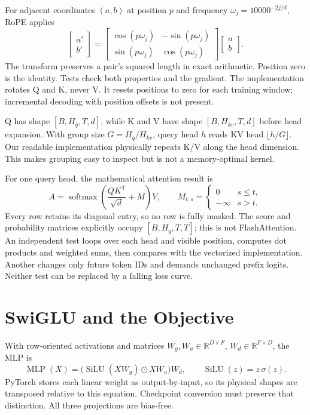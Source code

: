 For adjacent coordinates \((a,b)\) at position \(p\) and frequency
\(\omega_j=10000^{-2j/d}\), RoPE applies
\[
 \begin{bmatrix}a'\\b'\end{bmatrix}
 =\begin{bmatrix}\cos(p\omega_j)&-\sin(p\omega_j)\\
 \sin(p\omega_j)&\cos(p\omega_j)\end{bmatrix}
 \begin{bmatrix}a\\b\end{bmatrix}.
\]
The transform preserves a pair's squared length in exact arithmetic.
Position zero is the identity. Tests check both properties and the gradient.
The implementation rotates Q and K, never V. It resets positions to zero for
each training window; incremental decoding with position offsets is not present.

Q has shape \([B,H_q,T,d]\), while K and V have shape
\([B,H_{kv},T,d]\) before head expansion. With group size
\(G=H_q/H_{kv}\), query head \(h\) reads KV head \(\lfloor h/G\rfloor\).
Our readable implementation physically repeats K/V along the head dimension.
This makes grouping easy to inspect but is not a memory-optimal kernel.

For one query head, the mathematical attention result is
\[
 A=\operatorname{softmax}\!\left(\frac{QK^{\mathsf T}}{\sqrt d}+M\right)V,
 \qquad
 M_{t,s}=\begin{cases}0&s\leq t,\\-\infty&s>t.\end{cases}
\]
Every row retains its diagonal entry, so no row is fully masked. The score and
probability matrices explicitly occupy \([B,H_q,T,T]\); this is not
FlashAttention. An independent test loops over each head and visible position,
computes dot products and weighted sums, then compares with the vectorized
implementation. Another changes only future token IDs and demands unchanged
prefix logits. Neither test can be replaced by a falling loss curve.

\section{SwiGLU and the Objective}

With row-oriented activations and matrices
\(W_g,W_u\in\mathbb{R}^{D\times F}\),
\(W_d\in\mathbb{R}^{F\times D}\), the MLP is
\[
 \operatorname{MLP}(X)=
 \bigl(\operatorname{SiLU}(XW_g)\odot XW_u\bigr)W_d,
 \qquad \operatorname{SiLU}(z)=z\,\sigma(z).
\]
PyTorch stores each linear weight as output-by-input, so its physical shapes
are transposed relative to this equation. Checkpoint conversion must preserve
that distinction. All three projections are bias-free.

